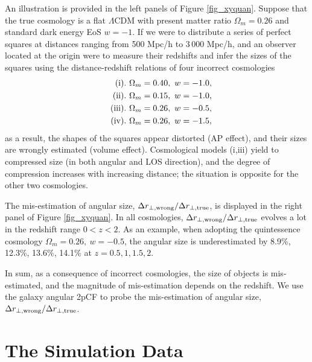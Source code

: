 \documentclass[iop]{emulateapj}
\begin{document}
An illustration is provided in the left panels of Figure \ref{fig_xyquan}.
Suppose that the true cosmology is a flat $\Lambda$CDM with present matter ratio $\Omega_m=0.26$
and standard dark energy EoS $w=-1$.
If we were to distribute a series of perfect squares at distances ranging from 500 Mpc/h to 3\,000 Mpc/h,
and an observer located at the origin were to measure their redshifts and infer the sizes of the squares
using the distance-redshift relations of four incorrect cosmologies
\begin{eqnarray}
 & &{\rm (i)}.\ \Omega_m=0.40,\ w=-1.0, \nonumber \\ 
 & &{\rm (ii)}.\ \Omega_m=0.15,\ w=-1.0, \nonumber\\ \noindent
 & &{\rm (iii)}.\ \Omega_m=0.26,\ w=-0.5,\nonumber\\ \noindent
 & &{\rm (iv)}.\ \Omega_m=0.26,\ w=-1.5,  \nonumber \noindent 
\end{eqnarray}
as a result, 
the shapes of the squares appear distorted (AP effect),
and their sizes are wrongly estimated (volume effect).
Cosmological models (i,iii) yield to compressed size (in both angular and LOS direction),
and the degree of compression increases with increasing distance;
the situation is opposite for the other two cosmologies.

The mis-estimation of angular size, ${\Delta r_{\perp, \rm wrong}}/{\Delta r_{\perp, \rm true}}$, 
is displayed in the right panel of Figure \ref{fig_xyquan}.
In all cosmologies, ${\Delta r_{\perp, \rm wrong}}/{\Delta r_{\perp, \rm true}}$ evolves a lot in the redshift range $0<z<2$.
As an example, when adopting the quintessence cosmology $\Omega_m=0.26,\ w=-0.5$,
the angular size is underestimated by 
8.9\%, 12.3\%, 13.6\%, 14.1\% 
at $z=0.5,1,1.5,2$.


In sum, as a consequence of incorrect cosmologies, 
the size of objects is mis-estimated, and the magnitude of mis-estimation depends on the redshift.
We use the galaxy angular 2pCF to probe the mis-estimation of angular size, ${\Delta r_{\perp, \rm wrong}}/{\Delta r_{\perp, \rm true}}$.


\section{The Simulation Data}\label{sec:data}
\end{document}

